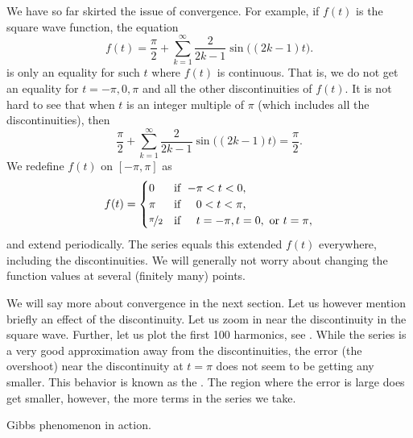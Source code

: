 \documentclass{ximera}
\begin{document}
We have so far skirted the issue of convergence.  For example, if $f(t)$ is the square wave function, the equation
\begin{equation*}
    f(t) =  \frac{\pi}{2} + \sum_{k=1}^\infty \frac{2}{2k-1} \sin \bigl( (2k-1) t \bigr) .
\end{equation*}
is only an equality for such $t$ where $f(t)$ is continuous.  That is, we do not get an equality for $t=-\pi,0,\pi$ and all the other discontinuities of $f(t)$.  It is not hard to see that when $t$ is an integer multiple of $\pi$ (which includes all the discontinuities), then
\begin{equation*}
    \frac{\pi}{2} + \sum_{k=1}^\infty \frac{2}{2k-1} \sin \bigl( (2k-1) t \bigr) = \frac{\pi}{2} .
\end{equation*}
We redefine $f(t)$ on $[-\pi,\pi]$ as
\begin{equation*}
    f(t) =
    \begin{cases}
        0 & \text{if } \; {-\pi} < t < 0 , \\
        \pi & \text{if } \; \phantom{-}0 < t < \pi , \\
        \nicefrac{\pi}{2} & \text{if } \; \phantom{-}t = -\pi, t = 0,\text{ or } t = \pi,
    \end{cases}
\end{equation*}
and extend periodically. The series equals this extended $f(t)$ everywhere, including the discontinuities. We will generally not worry about changing the function values at several (finitely many) points.

We will say more about convergence in the next section.  Let us however mention briefly an effect of the discontinuity.  Let us zoom in near the discontinuity in the square wave.  Further, let us plot the first 100 harmonics, see .  While the series is a very good approximation away from the discontinuities, the error (the overshoot) near the discontinuity at $t=\pi$ does not seem to be getting any smaller. This behavior is known as the \emph{}. The region where the error is large does get smaller, however, the more terms in the series we take.

\begin{myfig}
    \capstart
    \caption{Gibbs phenomenon in action.\label{ts:squarewavegibbsfig}}
\end{myfig}
\end{document}
